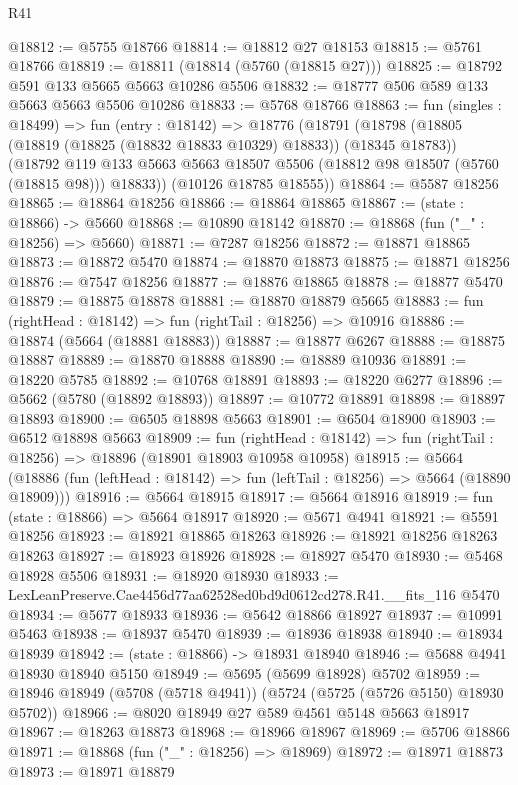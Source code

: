 \begin{lexlean}{R41}
\begin{coremodule}
@18812 := @5755 @18766
@18814 := @18812 @27 @18153
@18815 := @5761 @18766
@18819 := @18811 (@18814 (@5760 (@18815 @27)))
@18825 := @18792 @591 @133 @5665 @5663 @10286 @5506
@18832 := @18777 @506 @589 @133 @5663 @5663 @5506 @10286
@18833 := @5768 @18766
@18863 := fun (singles : @18499) =>
  fun (entry : @18142) =>
  @18776
    (@18791
      (@18798
        (@18805 (@18819 (@18825 (@18832 @18833 @10329) @18833)) (@18345 @18783))
        (@18792 @119 @133 @5663 @5663 @18507 @5506 (@18812 @98 @18507 (@5760 (@18815 @98))) @18833))
      (@10126 @18785 @18555))
@18864 := @5587 @18256
@18865 := @18864 @18256
@18866 := @18864 @18865
@18867 := (state : @18866) -> @5660
@18868 := @10890 @18142
@18870 := @18868 (fun ("_" : @18256) => @5660)
@18871 := @7287 @18256
@18872 := @18871 @18865
@18873 := @18872 @5470
@18874 := @18870 @18873
@18875 := @18871 @18256
@18876 := @7547 @18256
@18877 := @18876 @18865
@18878 := @18877 @5470
@18879 := @18875 @18878
@18881 := @18870 @18879 @5665
@18883 := fun (rightHead : @18142) => fun (rightTail : @18256) => @10916
@18886 := @18874 (@5664 (@18881 @18883))
@18887 := @18877 @6267
@18888 := @18875 @18887
@18889 := @18870 @18888
@18890 := @18889 @10936
@18891 := @18220 @5785
@18892 := @10768 @18891
@18893 := @18220 @6277
@18896 := @5662 (@5780 (@18892 @18893))
@18897 := @10772 @18891
@18898 := @18897 @18893
@18900 := @6505 @18898 @5663
@18901 := @6504 @18900
@18903 := @6512 @18898 @5663
@18909 := fun (rightHead : @18142) =>
  fun (rightTail : @18256) => @18896 (@18901 @18903 @10958 @10958)
@18915 := @5664
    (@18886 (fun (leftHead : @18142) => fun (leftTail : @18256) => @5664 (@18890 @18909)))
@18916 := @5664 @18915
@18917 := @5664 @18916
@18919 := fun (state : @18866) => @5664 @18917
@18920 := @5671 @4941
@18921 := @5591 @18256
@18923 := @18921 @18865 @18263
@18926 := @18921 @18256 @18263 @18263
@18927 := @18923 @18926
@18928 := @18927 @5470
@18930 := @5468 @18928 @5506
@18931 := @18920 @18930
@18933 := LexLeanPreserve.Cae4456d77aa62528ed0bd9d0612cd278.R41.__fits_116 @5470
@18934 := @5677 @18933
@18936 := @5642 @18866 @18927
@18937 := @10991 @5463
@18938 := @18937 @5470
@18939 := @18936 @18938
@18940 := @18934 @18939
@18942 := (state : @18866) -> @18931 @18940
@18946 := @5688 @4941 @18930 @18940 @5150
@18949 := @5695 (@5699 @18928) @5702
@18959 := @18946 @18949 (@5708 (@5718 @4941)) (@5724 (@5725 (@5726 @5150) @18930 @5702))
@18966 := @8020 @18949 @27 @589 @4561 @5148 @5663 @18917
@18967 := @18263 @18873
@18968 := @18966 @18967
@18969 := @5706 @18866
@18971 := @18868 (fun ("_" : @18256) => @18969)
@18972 := @18971 @18873
@18973 := @18971 @18879

\end{coremodule}
\end{lexlean}
